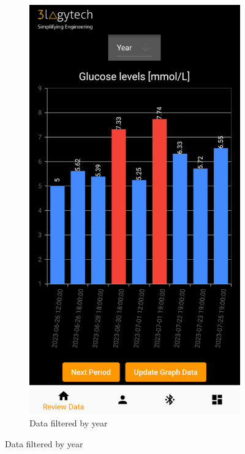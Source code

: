 \documentclass[a4paper]{scrreprt}
\begin{document}
\begin{figure}[h]
    \begin{subfigure}{0.45\textwidth}
        \centering
        \includegraphics[scale=0.47]{graph_year.png}
        \caption{Data filtered by year}
        \label{fig:graph6}
    \end{subfigure}
\end{figure}
\end{document}
